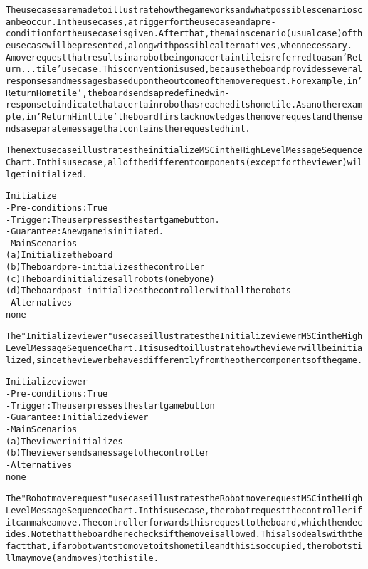 \begin{alltt}
\rm
The use cases are made to illustrate how the game works and what possible scenarios can be occur. In the use cases, a trigger for the use case and a pre-condition for the use case is given. After that, the main scenario (usual case) of the use case will be presented, along with possible alternatives, when necessary. \\
A move request that results in a robot being on a certain tile is referred to as an 'Return ... tile' use case. This convention is used, because the board provides several responses and messages based upon the outcome of the move request. For example, in 'Return Home tile', the board sends a predefined win-response to indicate that a certain robot has reached its home tile. As another example, in 'Return Hint tile' the board first acknowledges the move request and then sends a separate message that contains the requested hint.

The next use case illustrates the initialize MSC in the High Level Message Sequence Chart. In this use case, all of the different components (except for the viewer) will get initialized.

Initialize
- Pre-conditions: True
- Trigger: The user presses the start game button.
- Guarantee: A new game is initiated.
- Main Scenarios
    (a) Initialize the board
    (b) The board pre-initializes the controller
    (c) The board initializes all robots (one by one)
    (d) The board post-initializes the controller with all the robots
- Alternatives
    none

The "Initialize viewer" use case illustrates the Initialize viewer MSC in the High Level Message Sequence Chart. It is used to illustrate how the viewer will be initialized, since the viewer behaves differently from the other components of the game.

Initialize viewer
- Pre-conditions: True
- Trigger: The user presses the start game button
- Guarantee: Initialized viewer
- Main Scenarios
    (a) The viewer initializes
    (b) The viewer sends a message to the controller
- Alternatives
    none

The "Robot move request" use case illustrates the Robot move request MSC in the High Level Message Sequence Chart. In this use case, the robot request the controller if it can make a move. The controller forwards this request to the board, which then decides. Note that the board here checks if the move is allowed. This also deals with the fact that, if a robot wants to move to its home tile and this is occupied, the robot still may move (and moves) to this tile.


\end{alltt}
